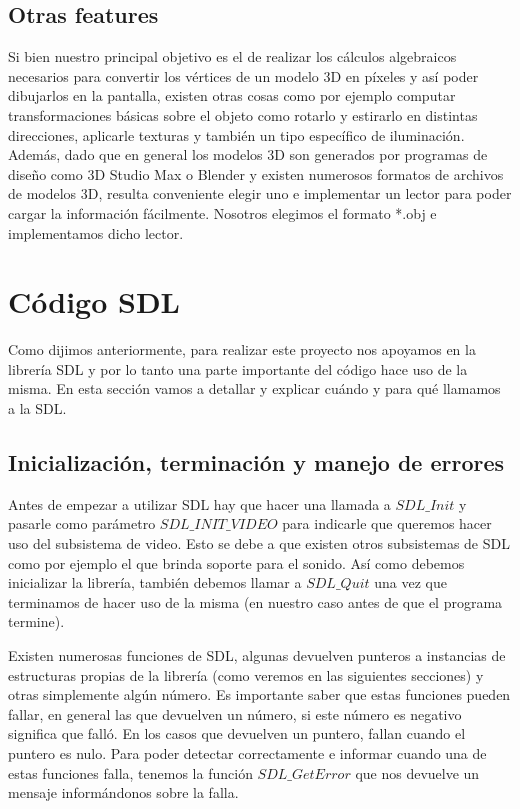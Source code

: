 \documentclass[a4paper]{article}
\begin{document}
\subsection{Otras features}
Si bien nuestro principal objetivo es el de realizar los cálculos algebraicos necesarios para convertir los vértices de un modelo 3D en píxeles y así poder dibujarlos en la pantalla, existen otras cosas como por ejemplo computar transformaciones básicas sobre el objeto como rotarlo y estirarlo en distintas direcciones, aplicarle texturas y también un tipo específico de iluminación. Además, dado que en general los modelos 3D son generados por programas de diseño como 3D Studio Max o Blender y existen numerosos formatos de archivos de modelos 3D, resulta conveniente elegir uno e implementar un lector para poder cargar la información fácilmente. Nosotros elegimos el formato *.obj e implementamos dicho lector.

\section{Código SDL}
Como dijimos anteriormente, para realizar este proyecto nos apoyamos en la librería SDL y por lo tanto una parte importante del código hace uso de la misma. En esta sección vamos a detallar y explicar cuándo y para qué llamamos a la SDL.
\subsection{Inicialización, terminación y manejo de errores}
Antes de empezar a utilizar SDL hay que hacer una llamada a $SDL\_Init$ y pasarle como parámetro $SDL\_INIT\_VIDEO$ para indicarle que queremos hacer uso del subsistema de video. Esto se debe a que existen otros subsistemas de SDL como por ejemplo el que brinda soporte para el sonido. Así como debemos inicializar la librería, también debemos llamar a $SDL\_Quit$ una vez que terminamos de hacer uso de la misma (en nuestro caso antes de que el programa termine).
\par Existen numerosas funciones de SDL, algunas devuelven punteros a instancias de estructuras propias de la librería (como veremos en las siguientes secciones) y otras simplemente algún número. Es importante saber que estas funciones pueden fallar, en general las que devuelven un número, si este número es negativo significa que falló. En los casos que devuelven un puntero, fallan cuando el puntero es nulo. Para poder detectar correctamente e informar cuando una de estas funciones falla, tenemos la función $SDL\_GetError$ que nos devuelve un mensaje informándonos sobre la falla.
\end{document}
